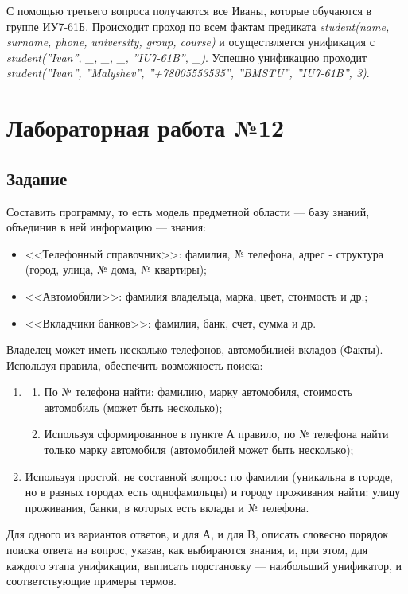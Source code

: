 \documentclass[12pt]{report}
\begin{document}
С помощью третьего вопроса получаются все Иваны, которые обучаются в группе ИУ7-61Б.  Происходит проход по всем фактам предиката \emph{student(name, surname, phone, university, group, course)} и осуществляется унификация с \emph{student(''Ivan'', \_, \_, \_, ''IU7-61B'', \_)}.  Успешно унификацию проходит \emph{student(''Ivan'', ''Malyshev'', ''+78005553535'', ''BMSTU'', ''IU7-61B'', 3)}.\\


\chapter*{Лабораторная работа №12}
\section*{Задание}
Составить программу, то есть модель предметной области — базу знаний, объединив в ней информацию — знания:

\begin{itemize}
	\item <<Телефонный справочник>>: фамилия, № телефона, адрес - структура (город, улица, № дома, № квартиры);
	\item <<Автомобили>>: фамилия владельца, марка, цвет, стоимость и др.;
	\item <<Вкладчики банков>>: фамилия, банк, счет, сумма и др.
\end{itemize}

Владелец может иметь несколько телефонов, автомобилией вкладов (Факты). Используя правила, обеспечить возможность поиска:

\begin{enumerate}
	\item \begin{enumerate}[label=\alph*)]
		\item По № телефона найти: фамилию, марку автомобиля, стоимость автомобиль (может быть несколько);
		\item Используя сформированное в пункте А правило, по № телефона найти только марку автомобиля (автомобилей может быть несколько);
	\end{enumerate}
	\item Используя простой, не составной вопрос: по фамилии (уникальна в городе, но в разных городах есть однофамильцы) и городу проживания найти: улицу проживания, банки, в которых есть вклады и № телефона.
\end{enumerate}

Для одного из вариантов ответов, и для А, и для B, описать словесно порядок поиска ответа на вопрос, указав, как выбираются знания, и, при этом, для каждого этапа унификации, выписать подстановку — наибольший унификатор, и соответствующие примеры термов.
\end{document}
